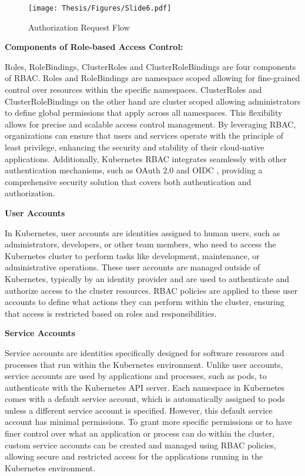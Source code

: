 \captionsetup{justification=centering}
\begin{figure}[h]
\centering
\texttt{[image: Thesis/Figures/Slide6.pdf]}
\caption{\label{fig:Authorization}Authorization Request Flow \cite{r47}}
\end{figure}


\textbf{Components of Role-based Access Control:}

Roles, RoleBindings, ClusterRoles and ClusterRoleBindings are four components of RBAC. Roles and RoleBindings are namespace scoped allowing for fine-grained control over resources within the specific namespaces. ClusterRoles and ClusterRoleBindings on the other hand are cluster scoped allowing administrators to define global permissions that apply across all namespaces. This flexibility allows for precise and scalable access control management. By leveraging RBAC, organizations can ensure that users and services operate with the principle of least privilege, enhancing the security and stability of their cloud-native applications. Additionally, Kubernetes RBAC integrates seamlessly with other authentication mechanisms, such as OAuth 2.0 and OIDC , providing a comprehensive security solution that covers both authentication and authorization. \cite{Kubernetes_doc}

\textbf{User Accounts}

In Kubernetes, user accounts are identities assigned to human users, such as administrators, developers, or other team members, who need to access the Kubernetes cluster to perform tasks like development, maintenance, or administrative operations. These user accounts are managed outside of Kubernetes, typically by an identity provider and are used to authenticate and authorize access to the cluster resources. RBAC policies are applied to these user accounts to define what actions they can perform within the cluster, ensuring that access is restricted based on roles and responsibilities. \cite{rahasak_Kubernetes_rbac}


\textbf{Service Accounts}

Service accounts are identities specifically designed for software resources and processes that run within the Kubernetes environment. Unlike user accounts, service accounts are used by applications and processes, such as pods, to authenticate with the Kubernetes API server. Each namespace in Kubernetes comes with a default service account, which is automatically assigned to pods unless a different service account is specified. However, this default service account has minimal permissions. To grant more specific permissions or to have finer control over what an application or process can do within the cluster, custom service accounts can be created and managed using RBAC policies, allowing secure and restricted access for the applications running in the Kubernetes environment. \cite{rahasak_Kubernetes_rbac}

